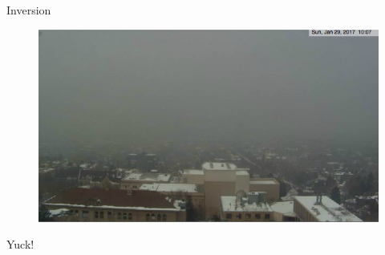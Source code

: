 \begin{frame}{Inversion}
\begin{figure}
	\includegraphics[width=\textwidth]{fig11}
\end{figure}
Yuck!
\end{frame}
